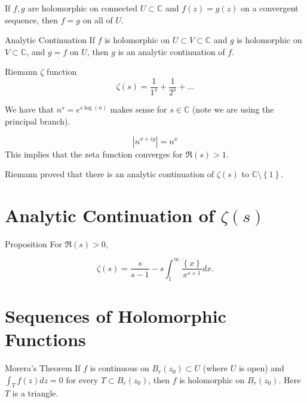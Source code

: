 \documentclass{article}
\begin{document}
\begin{cor}{}{}
If \( f,g \) are holomorphic on connected \( U \subset \mathbb{C}  \) and \( f(z) = g(z) \) on a convergent sequence, then \( f = g \) on all of \( U \). 
\end{cor}

\begin{defn}{Analytic Continuation}{}
If \( f \) is holomorphic on \( U \subset V \subset \mathbb{C}  \) and \( g \) is holomorphic on \( V \subset \mathbb{C}  \), and \( g = f \)  on \( U \), then \( g  \) is an analytic continuation of \( f \). 
\end{defn}


\begin{exmp}{Riemann \( \zeta  \) function}{}
    \[
        \zeta (s) = \frac{1}{1^s} + \frac{1}{2^s} + \dots 
    \]

    We have that \( n^s = e^{s \log (n) }  \) makes sense for \( s \in \mathbb{C}  \) (note we are using the principal branch). 

    \[
        \left\lvert n^{x+ iy}  \right\rvert = n^x
    \]
    This implies that the zeta function converges for \( \Re (s) > 1 \). 

    Riemann proved that there is an analytic continuation of \( \zeta (s) \) to \( \mathbb{C} \setminus \left\{ 1 \right\}  \). 
\end{exmp}

\section{Analytic Continuation of \( \zeta (s) \) }

\begin{misc}{Proposition}{}
For \( \Re (s)>0 \),

\[
    \zeta (s) = \frac{s}{s - 1} - s \int _1^{\infty}  \frac{\left\{ x \right\} }{x^{s+ 1} } dx.  
\]

\end{misc}


\section{Sequences of Holomorphic Functions}

\begin{thrm}{Morera's Theorem}{}
If \( f \) is continuous on \( B_r(z_0) \subset U\) (where \( U \) is open) and \( \int _T f(z) dz = 0 \) for every \( T \subset B_r(z_0) \), then \( f \) is holomorphic on \( B_{r}(z_0)  \). Here \( T \) is a triangle. 
\end{thrm}
\end{document}
